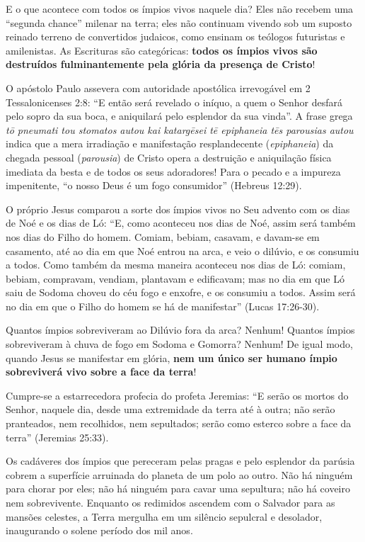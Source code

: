 \documentclass[11pt,a4paper,openany]{book}
\begin{document}
E o que acontece com todos os ímpios vivos naquele dia?
Eles não recebem uma ``segunda chance'' milenar na terra; eles não continuam vivendo sob um suposto reinado terreno de convertidos judaicos, como ensinam os teólogos futuristas e amilenistas. As Escrituras são categóricas: \textbf{todos os ímpios vivos são destruídos fulminantemente pela glória da presença de Cristo}!

O apóstolo Paulo assevera com autoridade apostólica irrevogável em 2 Tessalonicenses 2:8:
``E então será revelado o iníquo, a quem o Senhor desfará pelo sopro da sua boca, e aniquilará pelo esplendor da sua vinda''.
A frase grega \textit{tō pneumati tou stomatos autou kai katargēsei tē epiphaneia tēs parousias autou} indica que a mera irradiação e manifestação resplandecente (\textit{epiphaneia}) da chegada pessoal (\textit{parousia}) de Cristo opera a destruição e aniquilação física imediata da besta e de todos os seus adoradores! Para o pecado e a impureza impenitente, ``o nosso Deus é um fogo consumidor'' (Hebreus 12:29).

O próprio Jesus comparou a sorte dos ímpios vivos no Seu advento com os dias de Noé e os dias de Ló:
``E, como aconteceu nos dias de Noé, assim será também nos dias do Filho do homem. Comiam, bebiam, casavam, e davam-se em casamento, até ao dia em que Noé entrou na arca, e veio o dilúvio, e os consumiu a todos. Como também da mesma maneira aconteceu nos dias de Ló: comiam, bebiam, compravam, vendiam, plantavam e edificavam; mas no dia em que Ló saiu de Sodoma choveu do céu fogo e enxofre, e os consumiu a todos. Assim será no dia em que o Filho do homem se há de manifestar'' (Lucas 17:26-30).

Quantos ímpios sobreviveram ao Dilúvio fora da arca? Nenhum!
Quantos ímpios sobreviveram à chuva de fogo em Sodoma e Gomorra? Nenhum!
De igual modo, quando Jesus se manifestar em glória, \textbf{nem um único ser humano ímpio sobreviverá vivo sobre a face da terra}!

Cumpre-se a estarrecedora profecia do profeta Jeremias:
``E serão os mortos do Senhor, naquele dia, desde uma extremidade da terra até à outra; não serão pranteados, nem recolhidos, nem sepultados; serão como esterco sobre a face da terra'' (Jeremias 25:33).

Os cadáveres dos ímpios que pereceram pelas pragas e pelo esplendor da parúsia cobrem a superfície arruinada do planeta de um polo ao outro. Não há ninguém para chorar por eles; não há ninguém para cavar uma sepultura; não há coveiro nem sobrevivente. Enquanto os redimidos ascendem com o Salvador para as mansões celestes, a Terra mergulha em um silêncio sepulcral e desolador, inaugurando o solene período dos mil anos.
\end{document}
